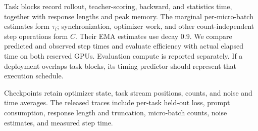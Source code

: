 Task blocks record rollout, teacher-scoring, backward, and statistics
time, together with response lengths and peak memory. The marginal
per-micro-batch estimates form $\tau_i$; synchronization, optimizer
work, and other count-independent step operations form $C$.
Their EMA estimates use decay $0.9$. We compare predicted and
observed step times and evaluate efficiency with actual elapsed
time on both reserved GPUs. Evaluation compute is reported separately.
If a deployment overlaps task blocks, its timing predictor should
represent that execution schedule.

Checkpoints retain optimizer state, task stream positions, counts,
and noise and time averages. The released traces include per-task
held-out loss, prompt consumption, response length and truncation,
micro-batch counts, noise estimates, and measured step time.
